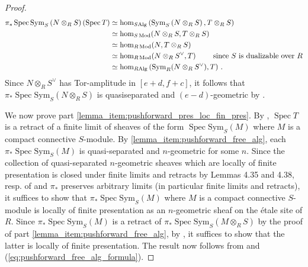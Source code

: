\documentclass{article}
\DeclareMathOperator{\Spec}{Spec}
\DeclareMathOperator{\Mod}{Mod} %
\theoremstyle{definition}
\newcommand{\Lucy}[1]{\todo[color=cyan!30]{\linespread{1}\footnotesize L: #1}}
\begin{document}
\begin{proof}
\begin{equation}
\begin{split}
         \pi_* \Spec \mathrm{Sym}_S \left(N \otimes_R S \right)(\Spec T) & \simeq \hom_{S\mathrm{Alg}}\left(\mathrm{Sym}_S \left(N \otimes_R S \right), T \otimes_R S \right) \\
         &\simeq \hom_{S\Mod}(N \otimes_R S, T \otimes_R S) \\
         &\simeq \hom_{R\Mod}(N, T \otimes_R S) \\
         &\simeq \hom_{R \Mod }(N \otimes_R S^\vee, T)\qquad \text{ since $ S $ is dualizable over $ R $} \\
         &\simeq \hom_{R\mathrm{Alg}}\left(\mathrm{Sym}_R (N \otimes_R S^\vee), T\right)\,.
    \end{split}
    \end{equation}
    Since $ N \otimes_R S^\vee $ has Tor-amplitude\Lucy{\cite[Proposition 2.13(4)]{MR3190610} or find ref in [TT90] later} in $ [e+d, f+c] $, it follows that $ \pi_* \Spec \mathrm{Sym}_S \left(N \otimes_R S \right) $ is quasiseparated and $ (e-d) $-geometric by \cite[Theorem 5.2]{MR3190610}. 

    We now prove part \ref{lemma_item:pushforward_pres_loc_fin_pres}. 
    By \cites[Proposition 7.2.4.27(b) \& (c)]{LurHA}[Lemma 5.4.2.4]{HTT}, $ \Spec T $ is a retract of a finite limit of sheaves of the form $ \Spec \mathrm{Sym}_S (M) $ where $ M $ is a compact connective $ S $-module. 
    By \ref{lemma_item:pushforward_free_alg}, each $ \pi_* \Spec \mathrm{Sym}_S(M) $ is quasi-separated and $ n $-geometric for some $ n $. 
    Since the collection of quasi-separated $ n $-geometric sheaves which are locally of finite presentation is closed under finite limits and retracts by Lemmas 4.35 and 4.38, resp. of \cite{MR3190610} and $ \pi_* $ preserves arbitrary limits (in particular finite limits and retracts), it suffices to show that $ \pi_* \Spec \mathrm{Sym}_S(M) $ where $ M $ is a compact connective $ S $-module is locally of finite presentation as an $ n $-geometric sheaf on the \'etale site of $ R $. 
    Since $ \pi_* \Spec \mathrm{Sym}_S(M) $ is a retract of $ \pi_* \Spec \mathrm{Sym}_S(M \otimes_R S) $ by the proof of part \ref{lemma_item:pushforward_free_alg}, by \cite[Lemma 4.38]{MR3190610}, it suffices to show that the latter is locally of finite presentation. 
    The result now follows from \cite[Theorem 5.2]{MR3190610} and (\ref{eq:pushforward_free_alg_formula}). 
\end{proof}
\end{document}
